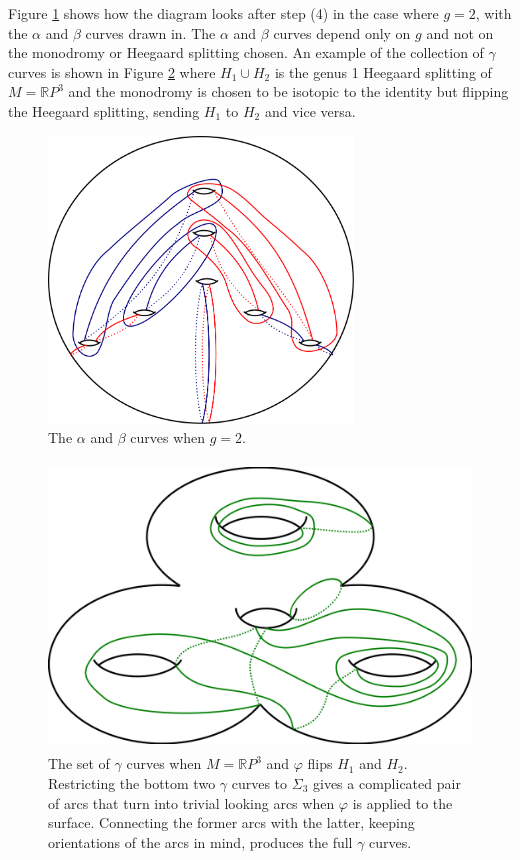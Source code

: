 \documentclass[12pt]{amsart}
\newcommand{\R}{\mathbb{R}}
\theoremstyle{definition}
\theoremstyle{remark}
\begin{document}
Figure \ref{firsttwocolors} shows how the diagram looks after step (4) in the case where $g=2$, with the $\alpha$ and $\beta$ curves drawn in.
The $\alpha$ and $\beta$ curves depend only on $g$ and not on the monodromy or Heegaard splitting chosen.
An example of the collection of $\gamma$ curves is shown in Figure \ref{greenex} where $H_1 \cup H_2$ is the genus 1 Heegaard splitting of $M = \R P^3$ and the monodromy is chosen to be isotopic to the identity but flipping the Heegaard splitting, sending $H_1$ to $H_2$ and vice versa.

\begin{figure}[h]
\centering
\includegraphics[height=3in]{diagrampart1.png}
\caption{The $\alpha$ and $\beta$ curves when $g=2$.}
\label{firsttwocolors}
\end{figure}

\begin{figure}[h]
\centering
\includegraphics[height=3in]{s1rp3_green.png}
\caption{The set of $\gamma$ curves when $M =\R P^3$ and $\varphi$ flips $H_1$ and $H_2$.
Restricting the bottom two $\gamma$ curves to $\Sigma_3$ gives a complicated pair of arcs that turn into trivial looking arcs when $\varphi$ is applied to the surface.
 Connecting the former arcs with the latter, keeping orientations of the arcs in mind, produces the full $\gamma$ curves.}
\label{greenex}
\end{figure}
\end{document}
